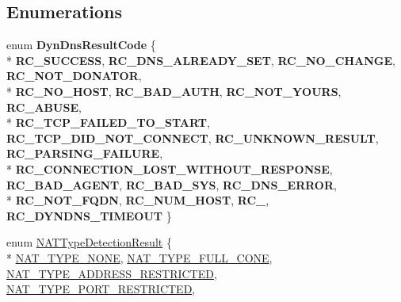 \subsection*{Enumerations}
\begin{DoxyCompactItemize}
\item 
enum {\bfseries Dyn\-Dns\-Result\-Code} \{ \\*
{\bfseries R\-C\-\_\-\-S\-U\-C\-C\-E\-S\-S}, 
{\bfseries R\-C\-\_\-\-D\-N\-S\-\_\-\-A\-L\-R\-E\-A\-D\-Y\-\_\-\-S\-E\-T}, 
{\bfseries R\-C\-\_\-\-N\-O\-\_\-\-C\-H\-A\-N\-G\-E}, 
{\bfseries R\-C\-\_\-\-N\-O\-T\-\_\-\-D\-O\-N\-A\-T\-O\-R}, 
\\*
{\bfseries R\-C\-\_\-\-N\-O\-\_\-\-H\-O\-S\-T}, 
{\bfseries R\-C\-\_\-\-B\-A\-D\-\_\-\-A\-U\-T\-H}, 
{\bfseries R\-C\-\_\-\-N\-O\-T\-\_\-\-Y\-O\-U\-R\-S}, 
{\bfseries R\-C\-\_\-\-A\-B\-U\-S\-E}, 
\\*
{\bfseries R\-C\-\_\-\-T\-C\-P\-\_\-\-F\-A\-I\-L\-E\-D\-\_\-\-T\-O\-\_\-\-S\-T\-A\-R\-T}, 
{\bfseries R\-C\-\_\-\-T\-C\-P\-\_\-\-D\-I\-D\-\_\-\-N\-O\-T\-\_\-\-C\-O\-N\-N\-E\-C\-T}, 
{\bfseries R\-C\-\_\-\-U\-N\-K\-N\-O\-W\-N\-\_\-\-R\-E\-S\-U\-L\-T}, 
{\bfseries R\-C\-\_\-\-P\-A\-R\-S\-I\-N\-G\-\_\-\-F\-A\-I\-L\-U\-R\-E}, 
\\*
{\bfseries R\-C\-\_\-\-C\-O\-N\-N\-E\-C\-T\-I\-O\-N\-\_\-\-L\-O\-S\-T\-\_\-\-W\-I\-T\-H\-O\-U\-T\-\_\-\-R\-E\-S\-P\-O\-N\-S\-E}, 
{\bfseries R\-C\-\_\-\-B\-A\-D\-\_\-\-A\-G\-E\-N\-T}, 
{\bfseries R\-C\-\_\-\-B\-A\-D\-\_\-\-S\-Y\-S}, 
{\bfseries R\-C\-\_\-\-D\-N\-S\-\_\-\-E\-R\-R\-O\-R}, 
\\*
{\bfseries R\-C\-\_\-\-N\-O\-T\-\_\-\-F\-Q\-D\-N}, 
{\bfseries R\-C\-\_\-\-N\-U\-M\-\_\-\-H\-O\-S\-T}, 
{\bfseries R\-C\-\_}, 
{\bfseries R\-C\-\_\-\-D\-Y\-N\-D\-N\-S\-\_\-\-T\-I\-M\-E\-O\-U\-T}
 \}
\item 
enum \hyperlink{namespace_rak_net_a81848fd95488939c0b3e217209f31139}{N\-A\-T\-Type\-Detection\-Result} \{ \\*
\hyperlink{namespace_rak_net_a81848fd95488939c0b3e217209f31139ad3683fb3b27ee4cb86db0f993fa9602b}{N\-A\-T\-\_\-\-T\-Y\-P\-E\-\_\-\-N\-O\-N\-E}, 
\hyperlink{namespace_rak_net_a81848fd95488939c0b3e217209f31139ad5b124b608265130efdfddb038b2be82}{N\-A\-T\-\_\-\-T\-Y\-P\-E\-\_\-\-F\-U\-L\-L\-\_\-\-C\-O\-N\-E}, 
\hyperlink{namespace_rak_net_a81848fd95488939c0b3e217209f31139a85b9244642c4226779a1702153310147}{N\-A\-T\-\_\-\-T\-Y\-P\-E\-\_\-\-A\-D\-D\-R\-E\-S\-S\-\_\-\-R\-E\-S\-T\-R\-I\-C\-T\-E\-D}, 
\hyperlink{namespace_rak_net_a81848fd95488939c0b3e217209f31139a535283d246a7f5e16837d39f7cc3a49a}{N\-A\-T\-\_\-\-T\-Y\-P\-E\-\_\-\-P\-O\-R\-T\-\_\-\-R\-E\-S\-T\-R\-I\-C\-T\-E\-D}, 

\end{DoxyCompactItemize}
